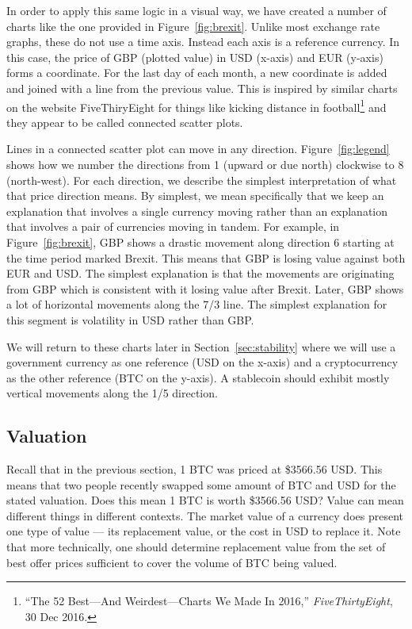 In order to apply this same logic in a visual way, we have created a number of charts like the one provided in Figure~\ref{fig:brexit}. Unlike most exchange rate graphs, these do not use a time axis. Instead each axis is a reference currency. In this case, the price of GBP (plotted value) in USD (x-axis) and EUR (y-axis) forms a coordinate. For the last day of each month, a new coordinate is added and joined with a line from the previous value. This is inspired by similar charts on the website FiveThiryEight for things like kicking distance in football\footnote{``The 52 Best---And Weirdest---Charts We Made In 2016,'' \textit{FiveThirtyEight}, 30 Dec 2016.} and they appear to be called connected scatter plots.

Lines in a connected scatter plot can move in any direction. Figure~\ref{fig:legend} shows how we number the directions from 1 (upward or due north) clockwise to 8 (north-west). For each direction, we describe the simplest interpretation of what that price direction means. By simplest, we mean specifically that we keep an explanation that involves a single currency moving rather than an explanation that involves a pair of currencies moving in tandem. For example, in Figure~\ref{fig:brexit}, GBP shows a drastic movement along direction 6 starting at the time period marked Brexit. This means that GBP is losing value against both EUR and USD. The simplest explanation is that the movements are originating from GBP which is consistent with it losing value after Brexit. Later, GBP shows a lot of horizontal movements along the 7/3 line. The simplest explanation for this segment is volatility in USD rather than GBP. 

We will return to these charts later in Section~\ref{sec:stability} where we will use a government currency as one reference (USD on the x-axis) and a cryptocurrency as the other reference (BTC on the y-axis). A stablecoin should exhibit mostly vertical movements along the 1/5 direction. 

\subsection{Valuation}

Recall that in the previous section, 1 BTC was priced at \$3566.56 USD. This means that two people recently swapped some amount of BTC and USD for the stated valuation. Does this mean 1 BTC is worth \$3566.56 USD? Value can mean different things in different contexts. The market value of a currency does present one type of value --- its replacement value, or the cost in USD to replace it. Note that more technically, one should  determine replacement value from the set of best offer prices sufficient to cover the volume of BTC being valued.

